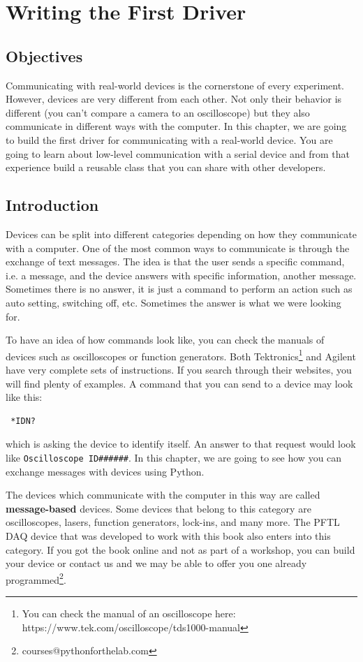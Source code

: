 \chapter{Writing the First Driver}\label{chapter:first-driver}
\section{Objectives}
Communicating with real-world devices is the cornerstone of every experiment. However, devices are very different from each other. Not only their behavior is different (you can't compare a camera to an oscilloscope) but they also communicate in different ways with the computer. In this chapter,
we are going to build the first driver for communicating with a real-world device. You are going to learn about low-level communication with a serial device and from that experience build a reusable class that you can share with other developers.

\section{Introduction}
Devices can be split into different categories depending on how they communicate with a computer. One of the most common ways to communicate is through the exchange of text messages. The idea is that the user sends a specific command, i.e. a message, and the device answers with specific information, another message. Sometimes there is no answer, it is just a command to perform an action such as auto setting, switching off, etc. Sometimes the answer is what we were looking for.

To have an idea of how commands look like, you can check the manuals of devices such as oscilloscopes or function generators. Both Tektronics\footnote{You can check the manual of an oscilloscope here: https://www.tek.com/oscilloscope/tds1000-manual} and Agilent have very complete sets of instructions. If you search through their websites, you will find plenty of examples. A command that you can send to a device may look like this:

\begin{verbatim}
 *IDN?
\end{verbatim}

which is asking the device to identify itself. An answer to that request would look like \texttt{Oscilloscope ID\#\#\#\#\#\#}. In this chapter, we are going to see how you can exchange messages with devices using Python.

The devices which communicate with the computer in this way are called \textbf{message-based} devices. Some devices that belong to this category are oscilloscopes, lasers, function generators, lock-ins, and many more. The {PFTL DAQ} device that was developed to work with this book also enters into this category. If you got the book online and not as part of a workshop, you can build your device or contact us and we may be able to offer you one already programmed\footnote{courses@pythonforthelab.com}.

